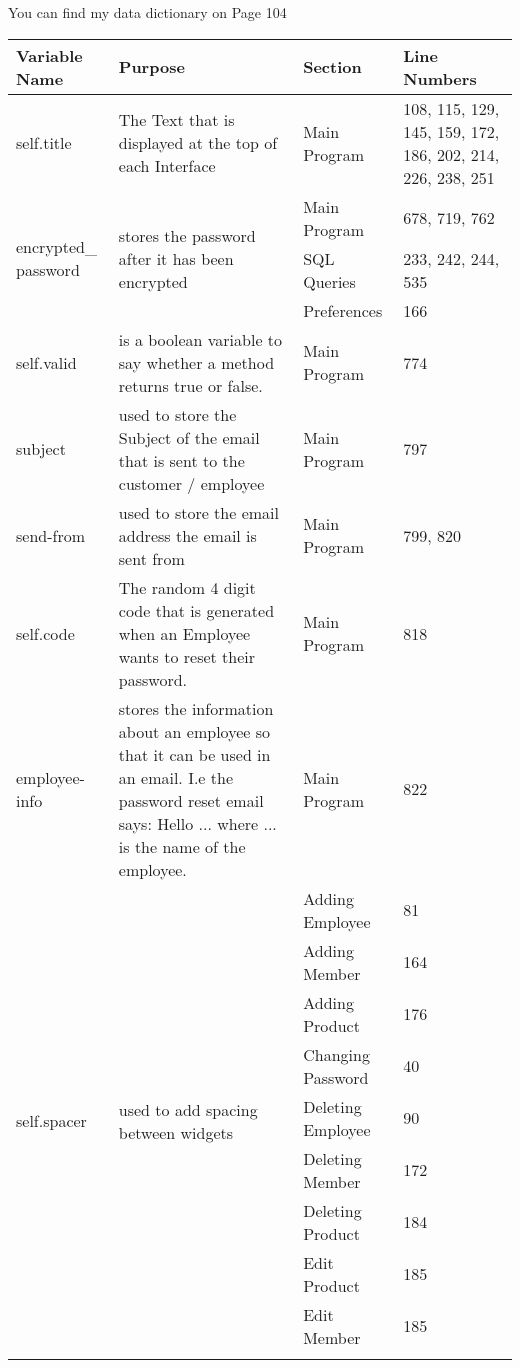 You can find my data dictionary on Page 104 
\begin{center}
    \begin{longtable}{|p{1.5cm}|p{4.5cm}|p{1.5cm}|p{3cm}|}
        \hline
        \textbf{Variable Name} & \textbf{Purpose} & \textbf{Section} & \textbf{Line Numbers}\\ \hline
	self.title & The Text that is displayed at the top of each Interface & Main Program & 108, 115, 129, 145, 159, 172, 186, 202, 214, 226, 238, 251 \\ \hline
	\multirow{3}{1.5cm}{encrypted\_ password} & \multirow{3}{4.5cm}{stores the password after it has been encrypted} & Main Program & 678, 719, 762 \\ \cline{3-4}
	& & SQL Queries & 233, 242, 244, 535 \\ \cline{3-4}
	& & Preferences & 166 \\ \hline
	self.valid & is a boolean variable to say whether a method returns true or false. & Main Program &  774 \\ \hline
	subject & used to store the Subject of the email that is sent to the customer / employee & Main Program & 797 \\ \hline
	send-from & used to store the email address the email is sent from & Main Program & 799, 820 \\ \hline
	self.code & The random 4 digit code that is generated when an Employee wants to reset their password. & Main Program & 818 \\ \hline
	employee-info & stores the information about an employee so that it can be used in an email. I.e the password reset email says: Hello ... where ... is the name of the employee. & Main Program & 822 \\ \hline
	\multirow{11}{1.5cm}{self.spacer} & \multirow{11}{4.5cm}{used to add spacing between widgets} & Adding Employee &  81 \\ \cline{3-4}
	& & Adding Member & 164 \\ \cline{3-4}
	& & Adding Product & 176 \\ \cline{3-4}
	& & Changing Password & 40 \\ \cline{3-4}
	& & Deleting Employee & 90 \\ \cline{3-4}
	& & Deleting Member & 172 \\ 
	& & Deleting Product & 184 \\ \cline{3-4}
	& & Edit Product & 185 \\ \cline{3-4}
	& & Edit Member & 185 \\ \cline{3-4}

\end{longtable}
\end{center}
